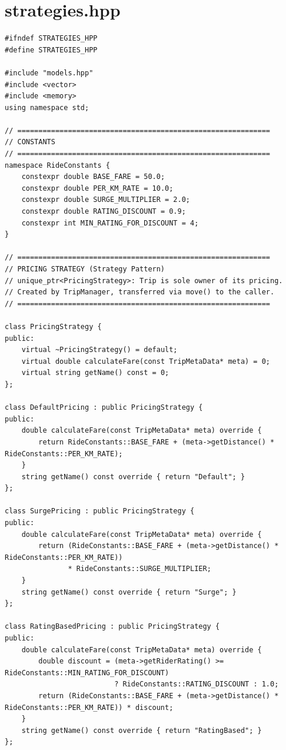 \documentclass[11pt,a4paper]{article}
\begin{document}
\newpage
\section{strategies.hpp}
\begin{lstlisting}[title={\texttt{strategies.hpp}}]
#ifndef STRATEGIES_HPP
#define STRATEGIES_HPP

#include "models.hpp"
#include <vector>
#include <memory>
using namespace std;

// ============================================================
// CONSTANTS
// ============================================================
namespace RideConstants {
    constexpr double BASE_FARE = 50.0;
    constexpr double PER_KM_RATE = 10.0;
    constexpr double SURGE_MULTIPLIER = 2.0;
    constexpr double RATING_DISCOUNT = 0.9;
    constexpr int MIN_RATING_FOR_DISCOUNT = 4;
}

// ============================================================
// PRICING STRATEGY (Strategy Pattern)
// unique_ptr<PricingStrategy>: Trip is sole owner of its pricing.
// Created by TripManager, transferred via move() to the caller.
// ============================================================

class PricingStrategy {
public:
    virtual ~PricingStrategy() = default;
    virtual double calculateFare(const TripMetaData* meta) = 0;
    virtual string getName() const = 0;
};

class DefaultPricing : public PricingStrategy {
public:
    double calculateFare(const TripMetaData* meta) override {
        return RideConstants::BASE_FARE + (meta->getDistance() * RideConstants::PER_KM_RATE);
    }
    string getName() const override { return "Default"; }
};

class SurgePricing : public PricingStrategy {
public:
    double calculateFare(const TripMetaData* meta) override {
        return (RideConstants::BASE_FARE + (meta->getDistance() * RideConstants::PER_KM_RATE))
               * RideConstants::SURGE_MULTIPLIER;
    }
    string getName() const override { return "Surge"; }
};

class RatingBasedPricing : public PricingStrategy {
public:
    double calculateFare(const TripMetaData* meta) override {
        double discount = (meta->getRiderRating() >= RideConstants::MIN_RATING_FOR_DISCOUNT)
                          ? RideConstants::RATING_DISCOUNT : 1.0;
        return (RideConstants::BASE_FARE + (meta->getDistance() * RideConstants::PER_KM_RATE)) * discount;
    }
    string getName() const override { return "RatingBased"; }
};


\end{lstlisting}
\end{document}
